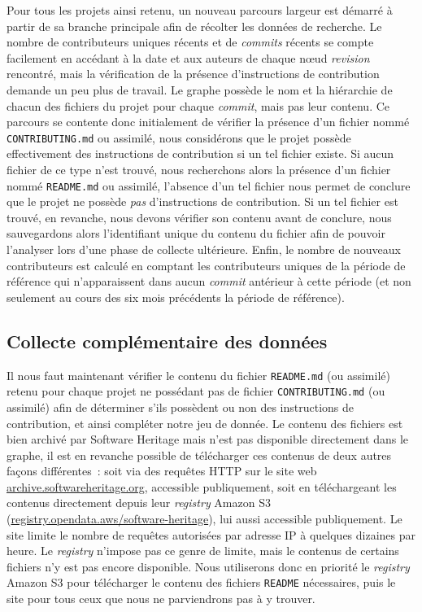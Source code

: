 \documentclass[dvipsnames,runningheads]{llncs}
\newcommand{\en}[1]{\foreignlanguage{english}{\emph{#1}}}
\begin{document}
    Pour tous les projets ainsi retenu, un nouveau parcours largeur est démarré à partir de sa branche
    principale afin de récolter les données de recherche. Le nombre de contributeurs uniques récents et de
    \en{commits} récents se compte facilement en accédant à la date et aux auteurs de chaque nœud
    \en{revision} rencontré, mais la vérification de la présence d'instructions de contribution demande un peu
    plus de travail. Le graphe possède le nom et la hiérarchie de chacun des fichiers du projet pour chaque
    \en{commit}, mais pas leur contenu. Ce parcours se contente donc initialement de vérifier la présence d'un
    fichier nommé \texttt{CONTRIBUTING.md} ou assimilé, nous considérons que le projet possède effectivement
    des instructions de contribution si un tel fichier existe. Si aucun fichier de ce type n'est trouvé, nous
    recherchons alors la présence d'un fichier nommé \texttt{README.md} ou assimilé, l'absence d'un tel
    fichier nous permet de conclure que le projet ne possède \emph{pas} d'instructions de contribution. Si un
    tel fichier est trouvé, en revanche, nous devons vérifier son contenu avant de conclure, nous sauvegardons
    alors l'identifiant unique du contenu du fichier afin de pouvoir l'analyser lors d'une phase de collecte
    ultérieure. Enfin, le nombre de nouveaux contributeurs est calculé en comptant les contributeurs uniques
    de la période de référence qui n'apparaissent dans aucun \en{commit} antérieur à cette période (et non
    seulement au cours des six mois précédents la période de référence).

    \subsection{Collecte complémentaire des données}
    \label{sec:collectreadme}

    Il nous faut maintenant vérifier le contenu du fichier \texttt{README.md} (ou assimilé) retenu pour chaque
    projet ne possédant pas de fichier \texttt{CONTRIBUTING.md} (ou assimilé) afin de déterminer s'ils
    possèdent ou non des instructions de contribution, et ainsi compléter notre jeu de donnée. Le contenu des
    fichiers est bien archivé par Software Heritage mais n'est pas disponible directement dans le graphe, il
    est en revanche possible de télécharger ces contenus de deux autres façons différentes : soit via des
    requêtes HTTP sur le site web \href{https://archive.softwareheritage.org/}{archive.softwareheritage.org},
    accessible publiquement, soit en téléchargeant les contenus directement depuis leur \en{registry} Amazon
    S3 (\href{https://registry.opendata.aws/software-heritage}{registry.opendata.aws/software-heritage}), lui
    aussi accessible publiquement. Le site limite le nombre de requêtes autorisées par adresse IP à quelques
    dizaines par heure. Le \en{registry} n'impose pas ce genre de limite, mais le contenus de certains
    fichiers n'y est pas encore disponible. Nous utiliserons donc en priorité le \en{registry} Amazon S3 pour
    télécharger le contenu des fichiers \texttt{README} nécessaires, puis le site pour tous ceux que nous ne
    parviendrons pas à y trouver.
\end{document}
